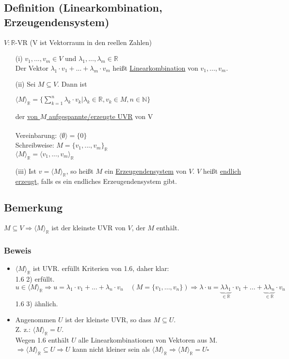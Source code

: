 \documentclass[12pt,titlepage]{article}
\newcommand{\R}{\mathds{R}}
\newcommand{\uline}[1]{\underline{#1}}
\renewcommand{\>}{\rightarrow}
\renewcommand{\*}{\cdot}
\begin{document}
\subsection{Definition (Linearkombination, Erzeugendensystem)}
$V: \R$-VR (V ist Vektorraum in den reellen Zahlen) \\
\begin{itemize}
	\item[(i)] $v_1, ... , v_m \in V$ und $\lambda_1,...,\lambda_m \in \R$\\ Der Vektor $\lambda_1 \* v_1 + ... + \lambda_m \* v_m$ heißt \uline{Linearkombination} von $v_1,...,v_m$.
	\item[(ii)] Sei $M \subseteq V$. Dann ist
	\begin{center}
		$\langle M \rangle_{\R} = \{ \sum_{k = 1}^{n} \lambda_k \cdot v_k \vert \lambda_k \in \R, v_k \in M, n \in \mathbb{N}\}$
	\end{center}
	der \underline{von $M$ aufgespannte/erzeugte UVR} von V \\
	\\
	Vereinbarung: $\langle \emptyset \rangle = \{0\}$\\
	Schreibweise: $M = \{v_1,...,v_m\}_{\R}$\\
	\noindent\hspace*{22mm}$\langle M \rangle_{\R} = \langle v_1,..., v_m\rangle_{\R} $
	\item[(iii)]
	Ist $v = \langle M \rangle_{\R}$, so heißt $M$ ein \uline{Erzeugendensystem} von $V$. $V$ heißt \uline{endlich erzeugt}, falls es ein endliches Erzeugendensystem gibt.
\end{itemize}
\subsection{Bemerkung}
$M \subseteq V \Rightarrow \langle M \rangle_{\R}$ ist der kleinste UVR von $V$, der $M$ enthält.\\
\subsubsection*{Beweis}
\begin{itemize}
	\item $\langle M \rangle_{\R}$ ist UVR. erfüllt Kriterien von 1.6, daher klar: \\
	1.6 2) erfüllt. $u \in \langle M \rangle_{\R} \Rightarrow u = \lambda_1 \cdot v_1 + ... + \lambda_n \cdot v_n\quad(M = \{v_1, ..., v_n \}) \Rightarrow \lambda \cdot u = \underbrace{\lambda  \lambda_1}_{\in \R} \cdot v_1 + ... + \underbrace{\lambda \lambda_n}_{\in \R} \cdot v_n$\\
	1.6 3) ähnlich.
	\item Angenommen $U$ ist der kleinste UVR, so dass $M \subseteq U$. \\
	Z. z.: $\langle M \rangle_{\R} = U.$\\
	Wegen 1.6 enthält $U$ alle Linearkombinationen von Vektoren aus M. \\
	$\Rightarrow \langle M \rangle_{\R} \subseteq U \Rightarrow U$ kann nicht kleiner sein als $\langle M \rangle_{\R} \Rightarrow \langle M \rangle_{\R} = U$\hfill$\square$
\end{itemize}
\end{document}
